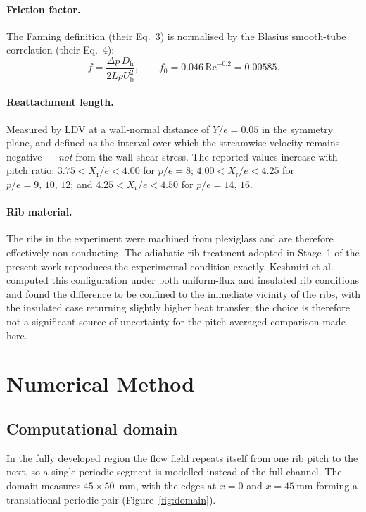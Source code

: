 \documentclass[11pt,a4paper]{article}
\newcommand{\Dh}{D_{\mathrm{h}}}
\newcommand{\Rey}{\mathrm{Re}}
\newcommand{\Xr}{X_{\mathrm{r}}}
\newcommand{\Ub}{U_{\mathrm{b}}}
\begin{document}
\paragraph{Friction factor.} The Fanning definition (their Eq.~3) is
normalised by the Blasius smooth-tube correlation (their Eq.~4):
\begin{equation}
  f = \frac{\Delta p \, \Dh}{2 L \rho \Ub^{2}}, \qquad
  f_{0} = 0.046\,\Rey^{-0.2} = 0.00585 .
  \label{eq:f0}
\end{equation}

\paragraph{Reattachment length.} Measured by LDV at a wall-normal distance
of $Y/e = 0.05$ in the symmetry plane, and defined as the interval over
which the streamwise velocity remains negative --- \emph{not} from the
wall shear stress. The reported values increase with pitch ratio:
$3.75 < \Xr/e < 4.00$ for $p/e = 8$; $4.00 < \Xr/e < 4.25$ for
$p/e = 9,\,10,\,12$; and $4.25 < \Xr/e < 4.50$ for $p/e = 14,\,16$.

\paragraph{Rib material.} The ribs in the experiment were machined from
plexiglass and are therefore effectively non-conducting. The adiabatic rib
treatment adopted in Stage~1 of the present work reproduces the
experimental condition exactly. Keshmiri et al.~\cite{keshmiri2016} computed
this configuration under both uniform-flux and insulated rib conditions and
found the difference to be confined to the immediate vicinity of the ribs,
with the insulated case returning slightly higher heat transfer; the choice
is therefore not a significant source of uncertainty for the pitch-averaged
comparison made here.

\section{Numerical Method}

\subsection{Computational domain}

In the fully developed region the flow field repeats itself from one rib
pitch to the next, so a single periodic segment is modelled instead of the
full channel. The domain measures $45 \times 50$~mm, with the edges at
$x = 0$ and $x = \SI{45}{\milli\meter}$ forming a translational periodic
pair (Figure~\ref{fig:domain}).
\end{document}
